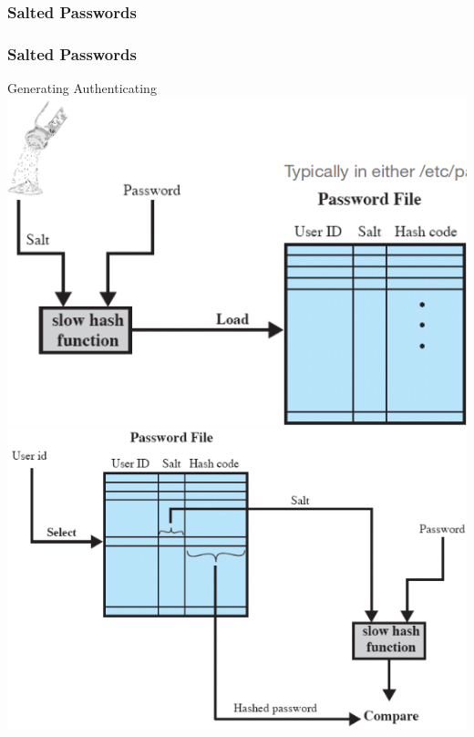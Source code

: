 \documentclass{beamer}
\begin{document}
\subsubsection{Salted Passwords}
\begin{frame}
\frametitle{Salted Passwords}
Generating \quad \quad \quad \quad \quad \quad \quad \quad \quad \quad \quad \quad \quad \quad \quad Authenticating\\
\includegraphics[scale=0.3]{salt1.png}\quad
\vline
\includegraphics[scale=0.3]{salt2.png}

\end{frame}
\end{document}
